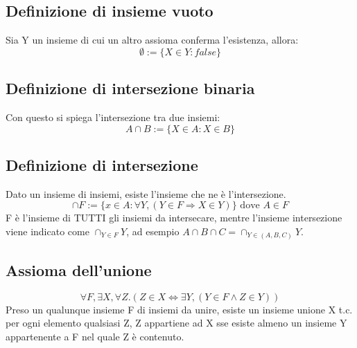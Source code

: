 \documentclass[12pt]{article}
\begin{document}
\subsection{Definizione di insieme vuoto}
Sia Y un insieme di cui un altro assioma conferma l'esistenza, allora:
\begin{equation}
    \emptyset := \{X \in Y : false\} \label{def:insieme_vuoto}
\end{equation}
\subsection{Definizione di intersezione binaria}
Con questo si spiega l'intersezione tra due insiemi:
\begin{equation}
    A \cap B := \{X \in A : X \in B\} \label{def:intersezione_binaria}
\end{equation}
\subsection{Definizione di intersezione}
Dato un insieme di insiemi, esiste l'insieme che ne è l'intersezione.
\begin{equation}
    \cap F := \{x \in A : \forall Y, (Y \in F \Rightarrow X \in Y)\} \text{ dove } A \in F
\end{equation}
F è l'insieme di TUTTI gli insiemi da intersecare, mentre l'insieme intersezione viene indicato come $\cap_{Y \in F}Y$, ad esempio $A \cap B \cap C = \cap_{Y \in (A, B, C)}Y$.
\subsection{Assioma dell'unione}
\begin{equation}
    \forall F, \exists X, \forall Z. (Z \in X \Leftrightarrow \exists Y, (Y \in F \wedge Z \in Y)) \label{ass:unione}
\end{equation}
Preso un qualunque insieme F di insiemi da unire, esiste un insieme unione X t.c. per ogni elemento qualsiasi Z, Z appartiene ad X sse esiste almeno un insieme Y appartenente a F nel quale Z è contenuto. 
\end{document}

